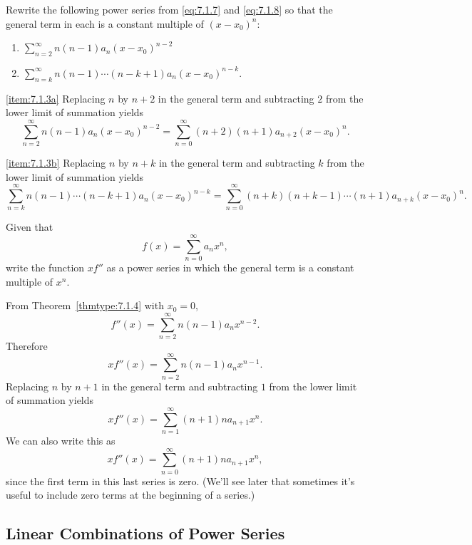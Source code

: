 \documentclass{ximera}
\begin{document}
\begin{example}\label{example:7.1.3}
Rewrite the following power series from \eqref{eq:7.1.7}  and \eqref{eq:7.1.8}
so that the general term in each  is a  constant multiple of
$(x-x_0)^n$:
\begin{enumerate}
    \item \label{item:7.1.3a}
$\sum_{n=2}^\infty
n(n-1)a_n(x-x_0)^{n-2}$
\item \label{item:7.1.3b}
$\sum_{n=k}^\infty
n(n-1)\cdots(n-k+1)a_n(x-x_0)^{n-k}.
$
\end{enumerate}

\begin{explanation}
\ref{item:7.1.3a} Replacing $n$ by $n+2$ in the general term
and subtracting $2$ from the lower limit of summation yields
$$
\sum_{n=2}^\infty n(n-1)a_n(x-x_0)^{n-2}=
\sum_{n=0}^\infty (n+2)(n+1)a_{n+2}(x-x_0)^n.
$$

\ref{item:7.1.3b}  Replacing $n$ by $n+k$ in the general term
and subtracting $k$ from the lower limit of summation yields
$$
\sum_{n=k}^\infty
n(n-1)\cdots(n-k+1)a_n(x-x_0)^{n-k}=
\sum_{n=0}^\infty (n+k)(n+k-1)\cdots(n+1)a_{n+k}(x-x_0)^n.
$$
\end{explanation}
\end{example}

\begin{example}\label{example:7.1.4}
Given that
$$
f(x)=\sum_{n=0}^\infty a_nx^n,
$$
write the function $xf''$  as a power series in which the general term
is a  constant multiple of $x^n$.

\begin{explanation}
From Theorem~\ref{thmtype:7.1.4} with $x_0=0$,
$$
f''(x)=\sum_{n=2}^\infty n(n-1)a_nx^{n-2}.
$$
Therefore
$$
xf''(x)=\sum_{n=2}^\infty n(n-1)a_nx^{n-1}.
$$
Replacing $n$ by $n+1$ in the general term and  subtracting $1$
from the lower limit of summation yields
$$
xf''(x)=\sum_{n=1}^\infty (n+1)na_{n+1}x^n.
$$
We can also write this as
$$
xf''(x)=\sum_{n=0}^\infty (n+1)na_{n+1}x^n,
$$
since the first term in this last series is zero.  (We'll see
later that  sometimes it's useful to include zero terms at the
beginning of a series.)

\end{explanation}
\end{example}

\subsection*{Linear Combinations of Power Series}
\end{document}
